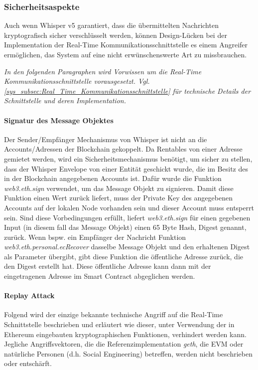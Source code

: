\subsubsection{Sicherheitsaspekte}
\label{subsubsec:Sicherheitsaspekte}
Auch wenn Whisper v5 garantiert, dass die übermittelten Nachrichten kryptografisch sicher verschlüsselt werden, können Design-Lücken bei der Implementation der Real-Time Kommunikationsschnittstelle es einem Angreifer ermöglichen, das System auf eine nicht erwünschenswerte Art zu missbrauchen.\cite[Wiki/Whisper Overview/Encryption in version 5]{go-ethereum}

\emph{In den folgenden Paragraphen wird Vorwissen um die Real-Time Kommunikationsschnittstelle vorausgesetzt. Vgl. \ref{sys_subsec:Real_Time_Kommunikationsschnittstelle} für technische Details der Schnittstelle und deren Implementation.}

\paragraph{Signatur des Message Objektes}
Der Sender/Empfänger Mechanismus von Whisper ist nicht an die Accounts/Adressen der Blockchain gekoppelt. Da Rentables von einer Adresse gemietet werden, wird ein Sicherheitsmechanismus benötigt, um sicher zu stellen, dass der Whisper Envelope von einer Entität geschickt wurde, die im Besitz des in der Blockchain angegebenen Accounts ist. Dafür wurde die Funktion \emph{web3.eth.sign} verwendet, um das Message Objekt zu signieren. Damit diese Funktion einen Wert zurück liefert, muss der Private Key des angegebenen Accounts auf der lokalen Node vorhanden sein und dieser Account muss entsperrt sein. Sind diese Vorbedingungen erfüllt, liefert \emph{web3.eth.sign} für einen gegebenen Input (in diesem fall das Message Objekt) einen 65 Byte Hash, Digest genannt, zurück. Wenn bspw. ein Empfänger der Nachricht Funktion \emph{web3.eth.personal.ecRecover} dasselbe Message Objekt und den erhaltenen Digest als Parameter übergibt, gibt diese Funktion die öffentliche Adresse zurück, die den Digest erstellt hat. Diese öffentliche Adresse kann dann mit der eingetragenen Adresse im Smart Contract abgeglichen werden.\cite[web3.eth/sign, web3.eth.personal/ecRecover]{web3js.readthedocs.io}

\paragraph{Replay Attack}
\label{para:Replay_Attack}
Folgend wird der einzige bekannte technische Angriff auf die Real-Time Schnittstelle beschrieben und erläutert wie dieser, unter Verwendung der in Ethereum eingebauten kryptographischen Funktionen, verhindert werden kann. Jegliche Angriffsvektoren, die die Referenzimplementation \emph{geth}, die \acrshort{EVM} oder natürliche Personen (d.h. Social Engineering) betreffen, werden nicht beschrieben oder entschärft.\cite[web3.eth/sign, web3.eth.personal/ecRecover]{web3js.readthedocs.io}\cite{keccak.noekeon.org}

